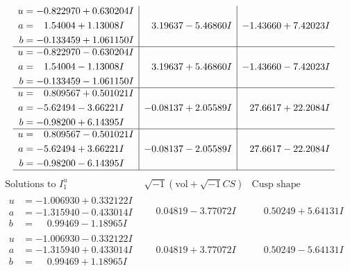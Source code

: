 \documentclass[1p]{elsarticle_modified}
\theoremstyle{definition}
\newcommand{\I}{\sqrt{-1}}
\begin{document}
$$\begin{array}{c|c|c}
\begin{aligned}
u &= -0.822970 + 0.630204 I \\
a &= \phantom{-}1.54004 + 1.13008 I \\
b &= -0.133459 + 1.061150 I\end{aligned}
 & \phantom{-}3.19637 - 5.46860 I & -1.43660 + 7.42023 I \\ \hline\begin{aligned}
u &= -0.822970 - 0.630204 I \\
a &= \phantom{-}1.54004 - 1.13008 I \\
b &= -0.133459 - 1.061150 I\end{aligned}
 & \phantom{-}3.19637 + 5.46860 I & -1.43660 - 7.42023 I \\ \hline\begin{aligned}
u &= \phantom{-}0.809567 + 0.501021 I \\
a &= -5.62494 - 3.66221 I \\
b &= -0.98200 + 6.14395 I\end{aligned}
 & -0.08137 + 2.05589 I & \phantom{-}27.6617 + 22.2084 I \\ \hline\begin{aligned}
u &= \phantom{-}0.809567 - 0.501021 I \\
a &= -5.62494 + 3.66221 I \\
b &= -0.98200 - 6.14395 I\end{aligned}
 & -0.08137 - 2.05589 I & \phantom{-}27.6617 - 22.2084 I\\
 \hline 
 \end{array}$$\newpage$$\begin{array}{c|c|c}  
\text{Solutions to }I^u_{1}& \I (\text{vol} + \sqrt{-1}CS) & \text{Cusp shape}\\
 \hline 
\begin{aligned}
u &= -1.006930 + 0.332122 I \\
a &= -1.315940 - 0.433014 I \\
b &= \phantom{-}0.99469 - 1.18965 I\end{aligned}
 & \phantom{-}0.04819 - 3.77072 I & \phantom{-}0.50249 + 5.64131 I \\ \hline\begin{aligned}
u &= -1.006930 - 0.332122 I \\
a &= -1.315940 + 0.433014 I \\
b &= \phantom{-}0.99469 + 1.18965 I\end{aligned}
 & \phantom{-}0.04819 + 3.77072 I & \phantom{-}0.50249 - 5.64131 I \\ \hline\begin{aligned}

\end{aligned}
\end{array}$$
\end{document}
